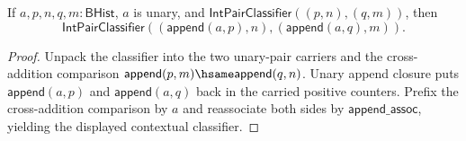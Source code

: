 \begin{theorem}
\label{thm:int-pair-classifier-append-positive-context}
If \(a,p,n,q,m:\mathsf{BHist}\), \(a\) is unary, and
\(\mathsf{IntPairClassifier}((p,n),(q,m))\), then
$$
\mathsf{IntPairClassifier}((\mathsf{append}(a,p),n),(\mathsf{append}(a,q),m)).
$$
\end{theorem}
\begin{proof}
Unpack the classifier into the two unary-pair carriers and the
cross-addition comparison
\(\mathsf{append}(p,m)\hsame\mathsf{append}(q,n)\). Unary append closure puts
\(\mathsf{append}(a,p)\) and \(\mathsf{append}(a,q)\) back in the carried
positive counters. Prefix the cross-addition comparison by \(a\) and reassociate
both sides by \(\mathsf{append\_assoc}\), yielding the displayed contextual
classifier.
\end{proof}

